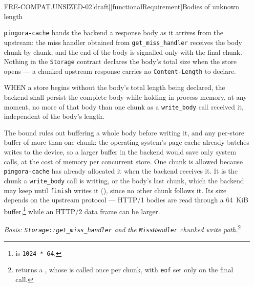 
\begin{requirement}{FRE-COMPAT.UNSIZED-02}[draft][functionalRequirement]{Bodies of unknown length}


  \texttt{pingora-cache} hands the backend a response body as it arrives from
  the upstream: the miss handler obtained from \texttt{get\_miss\_handler}
  receives the body chunk by chunk, and the end of the body is signalled only
  with the final chunk. Nothing in the \texttt{Storage} contract declares the
  body's total size when the store opens --- a chunked upstream response
  carries no \texttt{Content-Length} to declare.

  WHEN a store begins without the body's total length being declared, the
  backend shall persist the complete body while holding in process memory,
  at any moment, no more of that body than one chunk as a
  \texttt{write\_body} call received it, independent of the body's length.

  The bound rules out buffering a whole body before writing it, and any
  per-store buffer of more than one chunk: the operating system's page cache
  already batches writes to the device, so a larger buffer in the backend
  would save only system calls, at the cost of memory per concurrent store.
  One chunk is allowed because \texttt{pingora-cache} has already allocated
  it when the backend receives it. It is the chunk a \texttt{write\_body}
  call is writing, or the body's last chunk, which the backend may keep
  until \texttt{finish} writes it (), since
  no other chunk follows it. Its size depends on the upstream protocol ---
  HTTP/1 bodies
  are read through a 64~KiB buffer,\footnote{
  is \texttt{1024 * 64}.} while an HTTP/2 data frame can be larger.

  \textit{Basis: \texttt{Storage::get\_miss\_handler} and the
  \texttt{MissHandler} chunked write path.}\footnote{
  returns a ,
  whose 
  is called once per chunk, with \texttt{eof} set only on the final call.}



\end{requirement}

